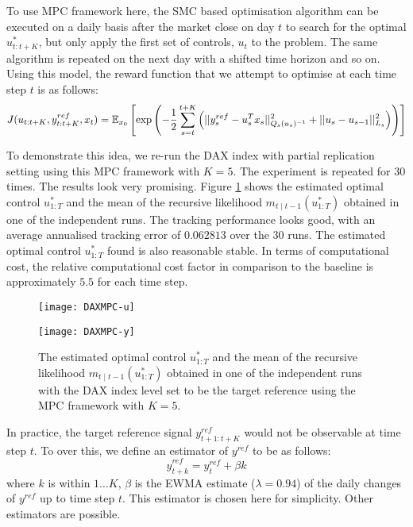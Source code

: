 To use MPC framework here, the SMC based optimisation algorithm can be executed on a daily basis after the market close on day $t$ to search for the optimal $u^*_{t:t+K}$, but only apply the first set of controls, $u_t$ to the problem. The same algorithm is repeated on the next day with a shifted time horizon and so on. Using this model, the reward function that we attempt to optimise at each time step $t$ is as follows:
\begin{equation}
  J(u_{t:t+K},y^{ref}_{t:t+K}, x_t) = \operatorname{\mathbb{E}}_{x_0}\left[ \exp \left( -\dfrac{1}{2}\displaystyle\sum^{t+K}_{s=t}\left(\vert\vert y^{ref}_s - u^T_sx_s \vert\vert^2_{Q_s(u_s)^{-1}}  + \vert\vert u_s - u_{s-1} \vert\vert^2_{L_s}\right) \right ) \right]
\label{eq:J2}
\end{equation}

To demonstrate this idea, we re-run the DAX index with partial replication setting using this MPC framework with $K=5$. The experiment is repeated for $30$ times. The results look very promising. Figure \ref{fig:mpc} shows the estimated optimal control $u^*_{1:T}$ and the mean of the recursive likelihood $m_{t \mid t-1}(u^*_{1:T})$ obtained in one of the independent runs. The tracking performance looks good, with an average annualised tracking error of $0.062813$ over the $30$ runs. The estimated optimal control $u^*_{1:T}$ found is also reasonable stable. In terms of computational cost, the relative computational cost factor in comparison to the baseline is approximately $5.5$ for each time step.
 
\begin{figure}[htbp]
\centering
    \begin{minipage}{0.5\textwidth}
        \centering
        \texttt{[image: DAXMPC-u]}
    \end{minipage}%
    \begin{minipage}{0.5\textwidth}
        \centering
        \texttt{[image: DAXMPC-y]}
    \end{minipage}
\caption{The estimated optimal control $u^*_{1:T}$ and the mean of the recursive likelihood $m_{t \mid t-1}(u^*_{1:T})$ obtained in one of the independent runs with the DAX index level set to be the target reference using the MPC framework with $K=5$.}
\label{fig:mpc}
\end{figure}

In practice, the target reference signal $y^{ref}_{t+1:t+K}$ would not be observable at time step $t$. To over this, we define an estimator of $y^{ref}$ to be as follows:
\begin{equation}
  \hat{y}^{ref}_{t+k} = y^{ref}_{t} + \beta k
\end{equation}
where $k$ is within $1 \ldots K$, $\beta$ is the EWMA estimate ($\lambda = 0.94$) of the daily changes of $y^{ref}$ up to time step $t$. This estimator is chosen here for simplicity. Other estimators are possible.


